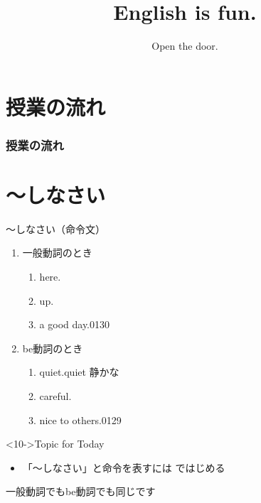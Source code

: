 \documentclass[aspectratio=169,xcolor={dvipsnames,table}]{beamer}
\title{English is fun.}
\subtitle{Open the door.
}
\author{}
\institute[]{}
\date[]
\begin{document}
\begin{frame}[plain]
  \titlepage
\end{frame}

\section*{授業の流れ}
\begin{frame}[plain]
  \frametitle{授業の流れ}
  \tableofcontents
\end{frame}

\section{〜しなさい}
\begin{frame}[plain]{～しなさい（命令文）}
 \large

\begin{enumerate}
\item<2-> 一般動詞のとき
      \begin{enumerate}
	\item<3->  here.
	\item<4->  up.
	\item<5->  a good day.\hfill{\tiny 0130}\,{\scriptsize {}}

      \end{enumerate}
 \item<6-> be動詞のとき
       \begin{enumerate}
	\item<7->  quiet.\hfill{\scriptsize quiet  静かな}  
	\item<8->  careful.
	\item<9->  nice to others.\hfill{\tiny 0129}\,{\scriptsize {}}
       \end{enumerate}
\end{enumerate}

\begin{block}<10->{Topic for Today}
\begin{itemize}[square]\small
 \item 「～しなさい」と命令を表すには\,\,ではじめる
 \end{itemize}
\hfill{\scriptsize 一般動詞でもbe動詞でも同じです}
     \end{block}

\end{frame}
\end{document}
